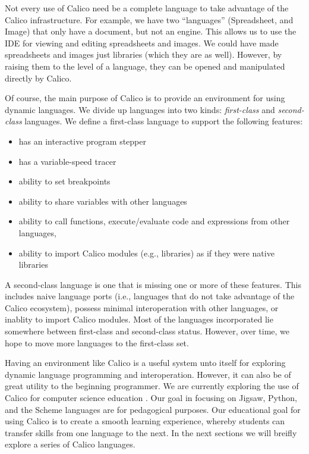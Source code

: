 \documentclass[preprint]{sigplanconf}
\begin{document}
Not every use of Calico need be a complete language to take advantage
of the Calico infrastructure. For example, we have two ``languages''
(Spreadsheet, and Image) that only have a document, but not an
engine. This allows us to use the IDE for viewing and editing
spreadsheets and images. We could have made spreadsheets and images
just libraries (which they are as well). However, by raising them to
the level of a language, they can be opened and manipulated directly
by Calico.

Of course, the main purpose of Calico is to provide an environment for
using dynamic languages. We divide up languages into two kinds:
\textit{first-class} and \textit{second-class} languages. We define a
first-class language to support the following features:

\begin{itemize}

\item has an interactive program stepper
\item has a variable-speed tracer
\item ability to set breakpoints
\item ability to share variables with other languages
\item ability to call functions, execute/evaluate code and expressions from other languages,
\item ability to import Calico modules (e.g., libraries) as if they were native libraries

\end{itemize}

A second-class language is one that is missing one or more of these
features. This includes naive language ports (i.e., languages that do
not take advantage of the Calico ecosystem), possess minimal
interoperation with other languages, or inablity to import Calico
modules. Most of the languages incorporated lie somewhere between
first-class and second-class status. However, over time, we hope to
move more languages to the first-class set.

Having an environment like Calico is a useful system unto itself for
exploring dynamic language programming and interoperation. However, it
can also be of great utility to the beginning programmer. We are
currently exploring the use of Calico for computer science education
\cite{blank-etal-2012, blank-ohara-2013}. Our goal in focusing on
Jigsaw, Python, and the Scheme languages are for pedagogical
purposes. Our educational goal for using Calico is to create a smooth
learning experience, whereby students can transfer skills from one
language to the next. In the next sections we will breifly explore a
series of Calico languages.
\end{document}
